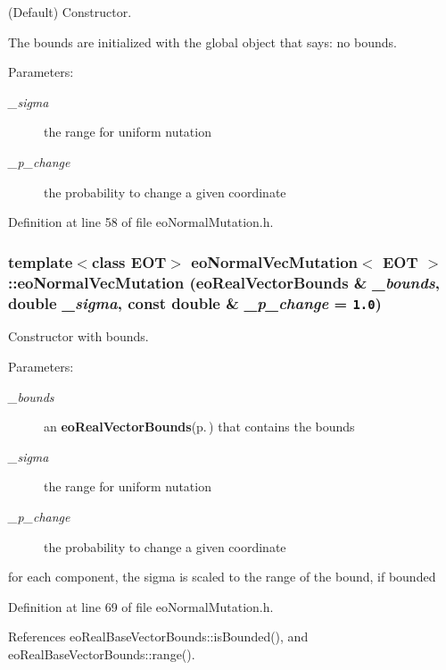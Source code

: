 (Default) Constructor. 

The bounds are initialized with the global object that says: no bounds.

\begin{Desc}
\item[Parameters:]
\begin{description}
\item[{\em \_\-sigma}]the range for uniform nutation \item[{\em \_\-p\_\-change}]the probability to change a given coordinate \end{description}
\end{Desc}


Definition at line 58 of file eo\-Normal\-Mutation.h.
\subsubsection{\setlength{\rightskip}{0pt plus 5cm}template$<$class EOT$>$ {\bf eo\-Normal\-Vec\-Mutation}$<$ {\bf EOT} $>$::{\bf eo\-Normal\-Vec\-Mutation} ({\bf eo\-Real\-Vector\-Bounds} \& {\em \_\-bounds}, double {\em \_\-sigma}, const double \& {\em \_\-p\_\-change} = {\tt 1.0})\hspace{0.3cm}{\tt  [inline]}}\label{classeo_normal_vec_mutation_a1}


Constructor with bounds. 

\begin{Desc}
\item[Parameters:]
\begin{description}
\item[{\em \_\-bounds}]an {\bf eo\-Real\-Vector\-Bounds}{\rm (p.\,\pageref{classeo_real_vector_bounds})} that contains the bounds \item[{\em \_\-sigma}]the range for uniform nutation \item[{\em \_\-p\_\-change}]the probability to change a given coordinate\end{description}
\end{Desc}
for each component, the sigma is scaled to the range of the bound, if bounded 

Definition at line 69 of file eo\-Normal\-Mutation.h.

References eo\-Real\-Base\-Vector\-Bounds::is\-Bounded(), and eo\-Real\-Base\-Vector\-Bounds::range().

